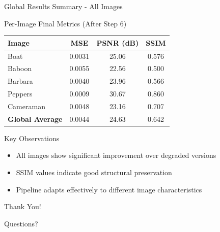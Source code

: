 \documentclass[aspectratio=169]{beamer}
\begin{document}
\begin{frame}{Global Results Summary - All Images}
    \begin{block}{Per-Image Final Metrics (After Step 6)}
        \begin{table}
            \centering
            \begin{tabular}{lccc}
                \toprule
                \textbf{Image} & \textbf{MSE} & \textbf{PSNR (dB)} & \textbf{SSIM} \\
                \midrule
                Boat & 0.0031 & 25.06 & 0.576 \\
                Baboon & 0.0055 & 22.56 & 0.500 \\
                Barbara & 0.0040 & 23.96 & 0.566 \\
                Peppers & 0.0009 & 30.67 & 0.860 \\
                Cameraman & 0.0048 & 23.16 & 0.707 \\
                \midrule
                \textbf{Global Average} & 0.0044 & 24.63 & 0.642 \\
                \bottomrule
            \end{tabular}
        \end{table}
    \end{block}
    
    \begin{alertblock}{Key Observations}
        \begin{itemize}
            \item All images show significant improvement over degraded versions
            \item SSIM values indicate good structural preservation
            \item Pipeline adapts effectively to different image characteristics
        \end{itemize}
    \end{alertblock}
\end{frame}

\begin{frame}
    \centering
    \Huge Thank You!
    
    \vspace{1cm}
    \Large Questions?
\end{frame}
\end{document}
